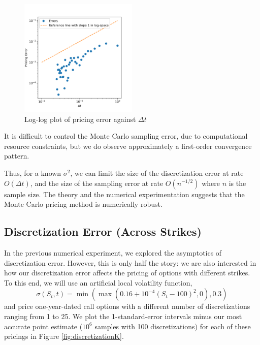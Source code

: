 \documentclass[11pt]{article}
\numberwithin{equation}{section}
\begin{document}
\begin{figure}[h!]
    \centering
    \includegraphics[width=0.5\textwidth]{figs/montecarlo_discrete.png}
    \caption{Log-log plot of pricing error against $\Delta t$}
    \label{fig:log-log}
\end{figure}

It is difficult to control the Monte Carlo sampling error, due to computational
resource constraints, but we do observe approximately a first-order convergence
pattern. 
  
Thus, for a known $\sigma^2$, we can limit the size of the discretization error
at rate $O(\Delta t)$, and the size of the sampling error at rate $O(n^{-1/2})$
where $n$ is the sample size. The theory and the numerical experimentation
suggests that the Monte Carlo pricing method is numerically robust. 

\subsection{Discretization Error (Across Strikes)}

In the previous numerical experiment, we explored the asymptotics of
discretization error. However, this is only half the story: we are also
interested in how our discretization error affects the pricing of options with
different strikes. To this end, we will use an artificial local volatility
function,
\[ \sigma(S_t, t) = \min(\max(0.16 + 10^{-4}(S_t - 100)^2, 0), 0.3) \]
and price one-year-dated call options with a different number of discretizations
ranging from 1 to 25. We plot the 1-standard-error intervals minus our most
accurate point estimate ($10^6$ samples with 100 discretizations) for each of
these pricings in Figure \ref{fig:discretizationK}.
\end{document}
